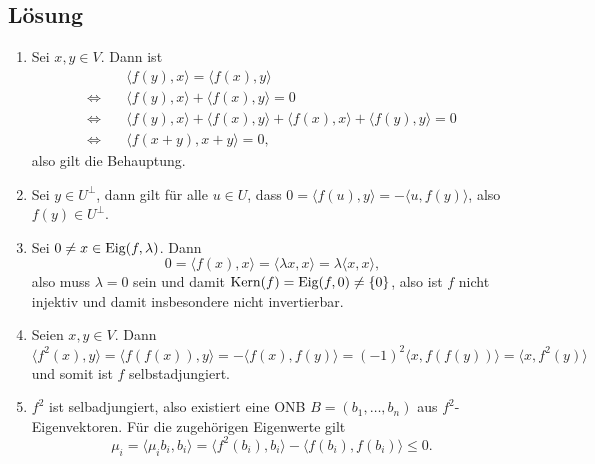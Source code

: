 \subsection{Lösung}
\begin{enumerate}
	\item Sei \( x,y \in V \). Dann ist
	\begin{align*}
		\quad &\langle f(y),x \rangle = \langle f(x),y \rangle \\
		\Leftrightarrow \quad &\langle f(y),x \rangle + \langle f(x),y \rangle = 0 \\
		\Leftrightarrow \quad &\langle f(y),x \rangle + \langle f(x),y \rangle + \langle f(x),x \rangle + \langle f(y),y \rangle = 0 \\
		\Leftrightarrow \quad &\langle f(x+y),x+y \rangle = 0\text{,}
	\end{align*}
	also gilt die Behauptung.
	\item Sei \( y \in U^\perp \), dann gilt für alle \( u \in U \), dass \( 0 = \langle f(u),y \rangle = -\langle u,f(y) \rangle \), also \( f(y) \in U^\perp \).
	\item Sei \( 0 \neq x \in \text{Eig}(f,\lambda) \). Dann
	\begin{equation*}
	 	0 = \langle f(x),x \rangle = \langle \lambda x,x \rangle = \lambda \langle x,x \rangle\text{,}
	 \end{equation*} 
	 also muss \( \lambda = 0 \) sein und damit \( \text{Kern}(f) = \text{Eig}(f,0) \neq \{ 0 \} \), also ist \( f \) nicht injektiv und damit insbesondere nicht invertierbar.
	\item Seien \( x,y \in V \). Dann
	\begin{equation*}
		\langle f^2(x),y \rangle = \langle f(f(x)),y \rangle = - \langle f(x),f(y) \rangle = (-1)^2\langle x,f(f(y)) \rangle = \langle x,f^2(y) \rangle
	\end{equation*}
	und somit ist \( f \) selbstadjungiert.
	\item \( f^2 \) ist selbadjungiert, also existiert eine ONB \( B = (b_1, \dots, b_n) \) aus \( f^2 \)-Eigenvektoren. Für die zugehörigen Eigenwerte gilt
	\begin{equation*}
		\mu_i = \langle \mu_ib_i,b_i \rangle = \langle f^2(b_i),b_i \rangle - \langle f(b_i),f(b_i) \rangle \leq 0\text{.}
	\end{equation*}
\end{enumerate}

\newpage

